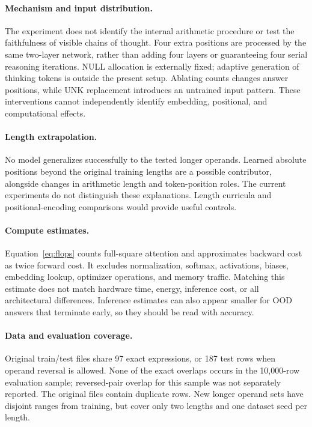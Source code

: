 \documentclass[10pt,twocolumn,letterpaper]{article}
\begin{document}
\paragraph{Mechanism and input distribution.}
The experiment does not identify the internal arithmetic procedure or test
the faithfulness of visible chains of thought. Four extra positions are
processed by the same two-layer network, rather than adding four layers or
guaranteeing four serial reasoning iterations. NULL allocation is externally
fixed; adaptive generation of thinking tokens is outside the present setup.
Ablating counts changes answer positions, while UNK replacement introduces an
untrained input pattern. These interventions cannot independently identify
embedding, positional, and computational effects.

\paragraph{Length extrapolation.}
No model generalizes successfully to the tested longer operands. Learned
absolute positions beyond the original training lengths are a possible
contributor, alongside changes in arithmetic length and token-position roles.
The current experiments do not distinguish these explanations. Length
curricula and positional-encoding comparisons would provide useful controls.

\paragraph{Compute estimates.}
Equation~\ref{eq:flops} counts full-square attention and approximates backward
cost as twice forward cost. It excludes normalization, softmax, activations,
biases, embedding lookup, optimizer operations, and memory traffic. Matching
this estimate does not match hardware time, energy, inference cost, or all
architectural differences. Inference estimates can also appear smaller for
OOD answers that terminate early, so they should be read with accuracy.

\paragraph{Data and evaluation coverage.}
Original train/test files share 97 exact expressions, or 187 test rows when
operand reversal is allowed. None of the exact overlaps occurs in the
10,000-row evaluation sample; reversed-pair overlap for this sample was not
separately reported. The original files contain duplicate rows. New longer
operand sets have disjoint ranges from training, but cover only two lengths
and one dataset seed per length.
\end{document}

